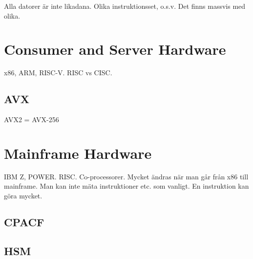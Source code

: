 Alla datorer är inte likadana. Olika instruktionsset, o.s.v. Det finns massvis med olika.

\section{Consumer and Server Hardware}

x86, ARM, RISC-V. RISC vs CISC. 

\subsection{AVX}

AVX2 = AVX-256

\section{Mainframe Hardware}

IBM Z, POWER. RISC. Co-processorer. Mycket ändras när man går från x86 till mainframe. Man kan inte mäta instruktioner etc. som vanligt. En instruktion kan göra mycket.

\subsection{CPACF}

\subsection{HSM}
